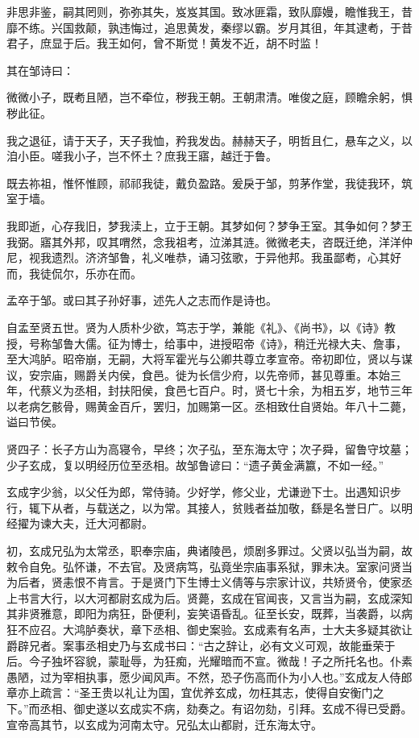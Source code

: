 \documentclass[]{article}
\begin{document}
非思非鉴，嗣其罔则，弥弥其失，岌岌其国。致冰匪霜，致队靡嫚，瞻惟我王，昔靡不练。兴国救颠，孰违悔过，追思黄发，秦缪以霸。岁月其徂，年其逮耇，于昔君子，庶显于后。我王如何，曾不斯觉！黄发不近，胡不时监！

其在邹诗曰：

微微小子，既耇且陋，岂不牵位，秽我王朝。王朝肃清。唯俊之庭，顾瞻余躬，惧秽此征。

我之退征，请于天子，天子我恤，矜我发齿。赫赫天子，明哲且仁，悬车之义，以洎小臣。嗟我小子，岂不怀土？庶我王寤，越迁于鲁。

既去祢祖，惟怀惟顾，祁祁我徒，戴负盈路。爰戾于邹，剪茅作堂，我徒我环，筑室于墙。

我即逝，心存我旧，梦我渎上，立于王朝。其梦如何？梦争王室。其争如何？梦王我弼。寤其外邦，叹其喟然，念我祖考，泣涕其涟。微微老夫，咨既迁绝，洋洋仲尼，视我遗烈。济济邹鲁，礼义唯恭，诵习弦歌，于异他邦。我虽鄙耇，心其好而，我徒侃尔，乐亦在而。

孟卒于邹。或曰其子孙好事，述先人之志而作是诗也。

自孟至贤五世。贤为人质朴少欲，笃志于学，兼能《礼》、《尚书》，以《诗》教授，号称邹鲁大儒。征为博士，给事中，进授昭帝《诗》，稍迁光禄大夫、詹事，至大鸿胪。昭帝崩，无嗣，大将军霍光与公卿共尊立孝宣帝。帝初即位，贤以与谋议，安宗庙，赐爵关内侯，食邑。徙为长信少府，以先帝师，甚见尊重。本始三年，代蔡义为丞相，封扶阳侯，食邑七百户。时，贤七十余，为相五岁，地节三年以老病乞骸骨，赐黄金百斤，罢归，加赐第一区。丞相致仕自贤始。年八十二薨，谥曰节侯。

贤四子：长子方山为高寝令，早终；次子弘，至东海太守；次子舜，留鲁守坟墓；少子玄成，复以明经历位至丞相。故邹鲁谚曰：``遗子黄金满籝，不如一经。''

玄成字少翁，以父任为郎，常侍骑。少好学，修父业，尤谦逊下士。出遇知识步行，辄下从者，与载送之，以为常。其接人，贫贱者益加敬，繇是名誉日广。以明经擢为谏大夫，迁大河都尉。

初，玄成兄弘为太常丞，职奉宗庙，典诸陵邑，烦剧多罪过。父贤以弘当为嗣，故敕令自免。弘怀谦，不去官。及贤病笃，弘竟坐宗庙事系狱，罪未决。室家问贤当为后者，贤恚恨不肯言。于是贤门下生博士义倩等与宗家计议，共矫贤令，使家丞上书言大行，以大河都尉玄成为后。贤薨，玄成在官闻丧，又言当为嗣，玄成深知其非贤雅意，即阳为病狂，卧便利，妄笑语昏乱。征至长安，既葬，当袭爵，以病狂不应召。大鸿胪奏状，章下丞相、御史案验。玄成素有名声，士大夫多疑其欲让爵辟兄者。案事丞相史乃与玄成书曰：``古之辞让，必有文义可观，故能垂荣于后。今子独坏容貌，蒙耻辱，为狂痴，光耀暗而不宣。微哉！子之所托名也。仆素愚陋，过为宰相执事，愿少闻风声。不然，恐子伤高而仆为小人也。''玄成友人侍郎章亦上疏言：``圣王贵以礼让为国，宜优养玄成，勿枉其志，使得自安衡门之下。''而丞相、御史遂以玄成实不病，劾奏之。有诏勿劾，引拜。玄成不得已受爵。宣帝高其节，以玄成为河南太守。兄弘太山都尉，迁东海太守。
\end{document}
